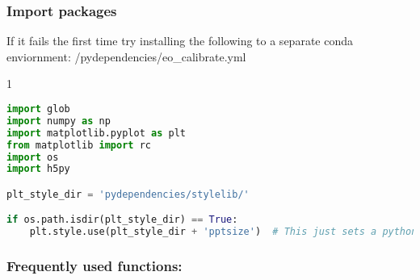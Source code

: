 \subsubsection{Import packages}\label{import-packages}

If it fails the first time try installing the following to a separate
conda enviornment: {/pydependencies/eo\_calibrate.yml}

\begin{spacing}{1} \begin{lstlisting}[frame=single, language=Python]
import glob
import numpy as np
import matplotlib.pyplot as plt
from matplotlib import rc
import os
import h5py

plt_style_dir = 'pydependencies/stylelib/'

if os.path.isdir(plt_style_dir) == True:
    plt.style.use(plt_style_dir + 'pptsize')  # This just sets a python figure style (you can adjust it to your preferences)
\end{lstlisting} \end{spacing}

\subsubsection{Frequently used
functions:}\label{frequently-used-functions}

